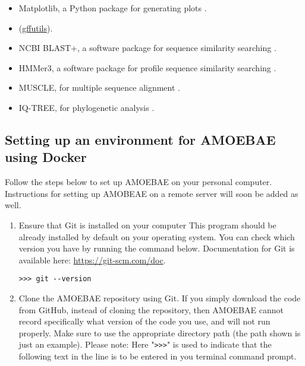 \documentclass[12pt,letterpaper]{article}
\begin{document}
\begin{linenumbers}
\begin{itemize}
\item Matplotlib, a Python package for generating plots \citep{hunter2007}.

\item (\href{https://pythonhosted.org/gffutils/}{gffutils}).

\item NCBI BLAST+, a software package for sequence similarity searching \citep{camacho2009}.

\item HMMer3, a software package for profile sequence similarity searching \citep{eddy1998}.

\item MUSCLE, for multiple sequence alignment \citep{edgar2004}.

\item IQ-TREE, for phylogenetic analysis \citep{nguyen2015}.


\end{itemize}


\subsection{Setting up an environment for AMOEBAE using Docker}
\label{setup_section}


Follow the steps below to set up AMOEBAE on your personal computer.
Instructions for setting up AMOBEAE on a remote server will soon be added as
well.

\begin{enumerate}

\item Ensure that Git is installed on your computer This program should be
    already installed by default on your operating system. You can check
    which version you have by running the command below. Documentation for
    Git is available here: \url{https://git-scm.com/doc}. 

\begin{lstlisting}
>>> git --version
\end{lstlisting}

\item Clone the AMOEBAE repository using Git. If you simply download the code
    from GitHub, instead of cloning the repository, then AMOEBAE cannot record
        specifically what version of the code you use, and will not run
        properly. Make sure to use the appropriate directory path (the path
        shown is just an example).  Please note: Here "\texttt{>{}>{}>}" is
        used to indicate that the following text in the line is to be entered
        in you terminal command prompt.


\end{enumerate}
\end{linenumbers}
\end{document}
